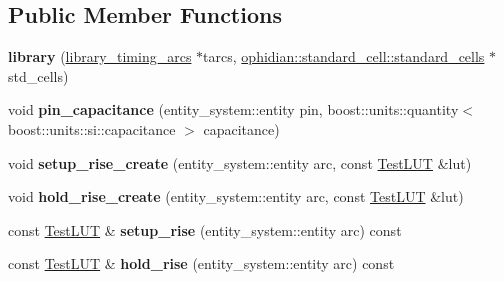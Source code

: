 \subsection*{Public Member Functions}
\begin{DoxyCompactItemize}
\item 
\hypertarget{classophidian_1_1timing_1_1library_ad3636ead6a7f5f606a30ed6aaef8b583}{{\bfseries library} (\hyperlink{classophidian_1_1timing_1_1library__timing__arcs}{library\-\_\-timing\-\_\-arcs} $\ast$tarcs, \hyperlink{classophidian_1_1standard__cell_1_1standard__cells}{ophidian\-::standard\-\_\-cell\-::standard\-\_\-cells} $\ast$std\-\_\-cells)}\label{classophidian_1_1timing_1_1library_ad3636ead6a7f5f606a30ed6aaef8b583}

\item 
\hypertarget{classophidian_1_1timing_1_1library_ad7576c03601ad79f6850edb839759636}{void {\bfseries pin\-\_\-capacitance} (entity\-\_\-system\-::entity pin, boost\-::units\-::quantity$<$ boost\-::units\-::si\-::capacitance $>$ capacitance)}\label{classophidian_1_1timing_1_1library_ad7576c03601ad79f6850edb839759636}

\item 
\hypertarget{classophidian_1_1timing_1_1library_a6ed33c0c8552b2ba277749bca4e3d0f1}{void {\bfseries setup\-\_\-rise\-\_\-create} (entity\-\_\-system\-::entity arc, const \hyperlink{classophidian_1_1timing_1_1lookup__table}{Test\-L\-U\-T} \&lut)}\label{classophidian_1_1timing_1_1library_a6ed33c0c8552b2ba277749bca4e3d0f1}

\item 
\hypertarget{classophidian_1_1timing_1_1library_a094fe28f2e877620f36d7641ed74f516}{void {\bfseries hold\-\_\-rise\-\_\-create} (entity\-\_\-system\-::entity arc, const \hyperlink{classophidian_1_1timing_1_1lookup__table}{Test\-L\-U\-T} \&lut)}\label{classophidian_1_1timing_1_1library_a094fe28f2e877620f36d7641ed74f516}

\item 
\hypertarget{classophidian_1_1timing_1_1library_a31bf8aa5013946f6ef68dd7c6b700e04}{const \hyperlink{classophidian_1_1timing_1_1lookup__table}{Test\-L\-U\-T} \& {\bfseries setup\-\_\-rise} (entity\-\_\-system\-::entity arc) const }\label{classophidian_1_1timing_1_1library_a31bf8aa5013946f6ef68dd7c6b700e04}

\item 
\hypertarget{classophidian_1_1timing_1_1library_ac4d4046f5c8211d47dab61a7ccacb9cf}{const \hyperlink{classophidian_1_1timing_1_1lookup__table}{Test\-L\-U\-T} \& {\bfseries hold\-\_\-rise} (entity\-\_\-system\-::entity arc) const }\label{classophidian_1_1timing_1_1library_ac4d4046f5c8211d47dab61a7ccacb9cf}


\end{DoxyCompactItemize}
